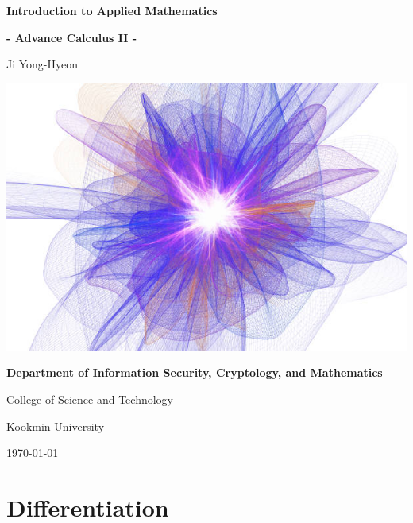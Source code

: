\documentclass[12pt,openany]{book}
\theoremstyle{definition}
\begin{document}
	
	\begin{titlepage}
		\begin{center}
			{\Huge\textsf{\textbf{Introduction to Applied Mathematics}}\par}
			{\Huge\textsf{\textbf{- Advance Calculus II -}}\par}
			\vspace{0.5in}
			{\Large Ji Yong-Hyeon\par}
			\vspace{1in}
			\includegraphics[scale=3]{iam2.jpg}\par
			\vspace{1in}
			{\large\bf Department of Information Security, Cryptology, and Mathematics\par}
			{College of Science and Technology\par}
			{Kookmin University\par}
			\vspace{.25in}
			{\large \today\par}
		\end{center}
	\end{titlepage}
	
	\tableofcontents
	
	\mainmatter
	
	\chapter{Differentiation}
\end{document}
